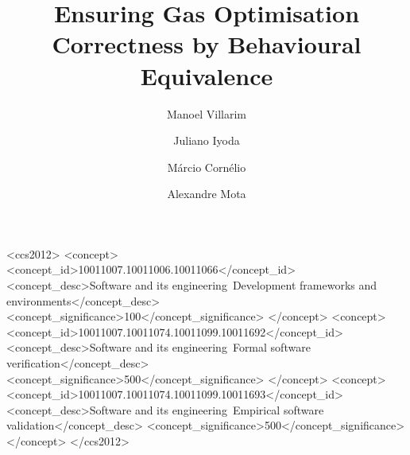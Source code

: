 \documentclass[manuscript,screen,review]{acmart}
\begin{document}
\title{Ensuring Gas Optimisation Correctness by Behavioural Equivalence}

\author{Manoel Villarim}

\author{Juliano Iyoda}

\author{Márcio Cornélio}

\author{Alexandre Mota}

\begin{CCSXML}
<ccs2012>
   <concept>
       <concept_id>10011007.10011006.10011066</concept_id>
       <concept_desc>Software and its engineering~Development frameworks and environments</concept_desc>
       <concept_significance>100</concept_significance>
   </concept>
   <concept>
       <concept_id>10011007.10011074.10011099.10011692</concept_id>
       <concept_desc>Software and its engineering~Formal software verification</concept_desc>
       <concept_significance>500</concept_significance>
   </concept>
   <concept>
       <concept_id>10011007.10011074.10011099.10011693</concept_id>
       <concept_desc>Software and its engineering~Empirical software validation</concept_desc>
       <concept_significance>500</concept_significance>
   </concept>
</ccs2012>
\end{CCSXML}
\end{document}
